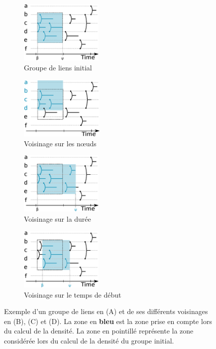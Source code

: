 \begin{figure}
\centering
	\begin{subfigure}{0.31\textwidth}
		\includegraphics[height=3cm]{img/GroupeDense/GroupExample/Voisinage/Base.eps}
		\caption{Groupe de liens initial}
	\end{subfigure}\hspace*{0.05cm}

	\begin{subfigure}{0.32\textwidth}
		\includegraphics[height=3cm]{img/GroupeDense/GroupExample/Voisinage/Variable_Nodes.eps}
		\caption{Voisinage sur les n\oe{}uds}
	\end{subfigure}
	\begin{subfigure}{0.32\textwidth}
		\includegraphics[height=3cm]{img/GroupeDense/GroupExample/Voisinage/Variable_duration.eps}
		\caption{Voisinage sur la durée}
	\end{subfigure}
	\begin{subfigure}{0.32\textwidth}
		\includegraphics[height=3cm]{img/GroupeDense/GroupExample/Voisinage/Variable_start.eps}
		\caption{Voisinage sur le temps de début}
	\end{subfigure}	
	\caption{Exemple d'un groupe de liens en (A) et de ses différents voisinages en (B), (C) et (D).
	La zone en \textcolor{bleu_transparent}{\textbf{bleu}} est la zone prise en compte lors du calcul de la densité.
	La zone en pointillé représente la zone considérée lors du calcul de la densité du groupe initial.
	}
	\label{fig:voisinage_groupe}
\end{figure}


